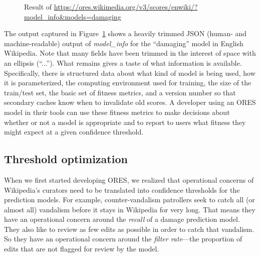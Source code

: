 \begin{figure}[htbp]
        \caption{Result of \url{https://ores.wikimedia.org/v3/scores/enwiki/?model_info&models=damaging}}
        \label{fig:english_damaging_model_info}
\end{figure}

The output captured in Figure~\ref{fig:english_damaging_model_info} shows a heavily trimmed JSON (human- and machine-readable) output of \emph{model\_info} for the ``damaging'' model in English Wikipedia.  Note that many fields have been trimmed in the interest of space with an ellipsis (``...'').  What remains gives a taste of what information is available.  Specifically, there is structured data about what kind of model is being used, how it is parameterized, the computing environment used for training, the size of the train/test set, the basic set of fitness metrics, and a version number so that secondary caches know when to invalidate old scores.  A developer using an ORES model in their tools can use these fitness metrics to make decisions about whether or not a model is appropriate and to report to users what fitness they might expect at a given confidence threshold.

\subsection{Threshold optimization}
\label{sec:appendix.threshold_optimization}
When we first started developing ORES, we realized that operational concerns of Wikipedia's curators need to be translated into confidence thresholds for the prediction models.  For example, counter-vandalism patrollers seek to catch all (or almost all) vandalism before it stays in Wikipedia for very long.  That means they have an operational concern around the \emph{recall} of a damage prediction model.  They also like to review as few edits as possible in order to catch that vandalism.  So they have an operational concern around the \emph{filter rate}---the proportion of edits that are not flagged for review by the model\cite{halfaker2016notes}.

